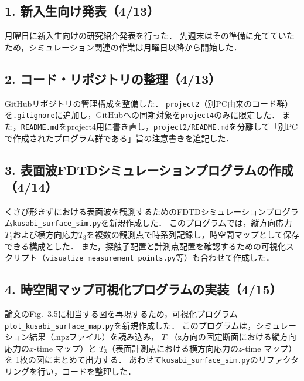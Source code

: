 \documentclass{jarticle}
\begin{document}
\subsection*{1. 新入生向け発表（4/13）}
月曜日に新入生向けの研究紹介発表を行った．
先週末はその準備に充てていたため，シミュレーション関連の作業は月曜日以降から開始した．

\subsection*{2. コード・リポジトリの整理（4/13）}
GitHubリポジトリの管理構成を整備した．
\texttt{project2}（別PC由来のコード群）を\texttt{.gitignore}に追加し，GitHubへの同期対象を\texttt{project4}のみに限定した．
また，\texttt{README.md}をproject4用に書き直し，\texttt{project2/README.md}を分離して「別PCで作成されたプログラム群である」旨の注意書きを追記した．

\subsection*{3. 表面波FDTDシミュレーションプログラムの作成（4/14）}
くさび形きずにおける表面波を観測するためのFDTDシミュレーションプログラム\texttt{kusabi\_surface\_sim.py}を新規作成した．
このプログラムでは，縦方向応力$T_1$および横方向応力$T_3$を複数の観測点で時系列記録し，時空間マップとして保存できる構成とした．
また，探触子配置と計測点配置を確認するための可視化スクリプト（\texttt{visualize\_measurement\_points.py}等）も合わせて作成した．

\subsection*{4. 時空間マップ可視化プログラムの実装（4/15）}
論文のFig.~3.5に相当する図を再現するため，可視化プログラム\texttt{plot\_kusabi\_surface\_map.py}を新規作成した．
このプログラムは，シミュレーション結果（.npzファイル）を読み込み，
$T_1$（z方向の固定断面における縦方向応力の$x$-time マップ）と
$T_3$（表面計測点における横方向応力の$z$-time マップ）を
1枚の図にまとめて出力する．
あわせて\texttt{kusabi\_surface\_sim.py}のリファクタリングを行い，コードを整理した．

\end{document}
